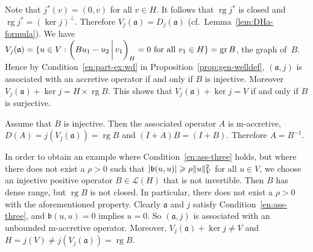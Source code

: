 \documentclass[a4paper,oneside,12pt]{amsart}
\theoremstyle{plain}
\theoremstyle{definition}
\newenvironment{example}
{\pushQED{\qed}

\examplex}
{\popQED\endexamplex}
\let\ge=\geqslant
\DeclarePairedDelimiter\norm{\lVert}{\rVert}
\DeclarePairedDelimiter\abs{\lvert}{\rvert}
\begin{document}
\begin{example}
Note that $j^*(v)=(0,v)$ for all $v\in H$. It follows that $\operatorname{rg} j^*$ is closed and $\operatorname{rg} j^*=(\ker j)^\perp$. Therefore $V_j({{\mathfrak{{a}}}})=D_j({{\mathfrak{{a}}}})$ (cf.\ Lemma~\ref{lem:DHa-formula}).
We have $V_j({{\mathfrak{{a}}}}) = \{u\in V: {{\ifthenelse{\equal{auto}{auto}}{\left({Bu_1-u_2}\mkern3mu{\biggm|}\mkern3mu {v_1}\right)}{}
\ifthenelse{\equal{auto}{b}}{\bigl({Bu_1-u_2}\mkern3mu{\biggm|}\mkern3mu {v_1}\bigr)}{}
\ifthenelse{\equal{auto}{B}}{\Bigl({Bu_1-u_2}\mkern3mu{\bigm|}\mkern3mu {v_1}\Bigr)}{}
}}_H=0\text{ for all $v_1\in H$}\}=\operatorname{gr} B$, the graph of~$B$. 
Hence by Condition~\ref{en:part-ex:wd} in Proposition~\ref{prop:gen-welldef}, $({{\mathfrak{{a}}}},j)$ is associated with an accretive operator if and only if $B$ is injective.
Moreover $V_j({{\mathfrak{{a}}}})+\ker j=H\times \operatorname{rg} B$.
This shows that $V_j({{\mathfrak{{a}}}})+\ker j=V$ if and only if $B$ is surjective.

Assume that $B$ is injective. Then the associated operator $A$ is {\ensuremath{\text{m}}}-accretive, $D(A)=j(V_j({{\mathfrak{{a}}}}))=\operatorname{rg} B$ and $(I+A)B = (I+B)$.
Therefore $A=B^{-1}$.

In order to obtain an example where Condition~\ref{en:ass-three} holds, but where there does not exist a $\rho>0$ such that $\abs{{{\mathfrak{{b}}}}(u,u)}\ge\rho\norm{u}_V^2$ for all $u\in V$, we choose an 
injective positive operator $B\in{\mathcal{L}}(H)$ that is not invertible. Then
$B$ has dense range, but $\operatorname{rg} B$ is not closed. In particular, there does not exist a $\rho>0$ with the aforementioned property.
Clearly ${{\mathfrak{{a}}}}$ and $j$ satisfy Condition~\ref{en:ass-three}, and ${{\mathfrak{{b}}}}(u,u)=0$ implies $u=0$.
So $({{\mathfrak{{a}}}},j)$ is associated with an unbounded {\ensuremath{\text{m}}}-accretive operator.
Moreover, $V_j({{\mathfrak{{a}}}})+\ker j\ne V$ and $H=j(V)\ne j(V_j({{\mathfrak{{a}}}}))=\operatorname{rg} B$.
\end{example}
\end{document}
